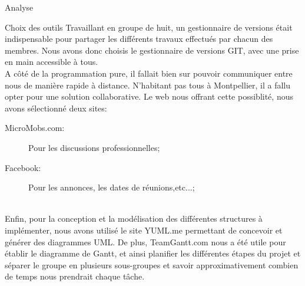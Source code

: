 \documentclass[a4paper, 12pt]{report}
\begin{document}
\begin{part}{Analyse}
\begin{chapter}{Choix des outils}
		Travaillant en groupe de huit, un gestionnaire de versions était indispensable pour partager les différents travaux effectués par chacun des membres. Nous avons donc choisis le gestionnaire de versions GIT, avec une prise en main accessible à tous. %
		\\
		A côté de la programmation pure, il fallait bien sur pouvoir communiquer entre nous de manière rapide à distance. N'habitant pas tous à Montpellier, il a fallu opter pour une solution collaborative. Le web nous offrant cette possiblité, nous avons sélectionné deux sites:
		\begin{description}
		\item[MicroMobs.com:] Pour les discussions professionnelles;
		\item[Facebook:] Pour les annonces, les dates de réunions,etc...;
		\end{description}\\
		Enfin, pour la conception et la modélisation des différentes structures à implémenter, nous avons utilisé le site YUML.me permettant de concevoir et générer des diagrammes UML. %
		De plus, TeamGantt.com nous a été utile pour établir le diagramme de Gantt, et ainsi planifier les différentes étapes du projet et séparer le groupe en plusieurs sous-groupes et savoir approximativement combien de temps nous prendrait chaque tâche.
		\\


		

				

\end{chapter}
\end{part}
\end{document}
